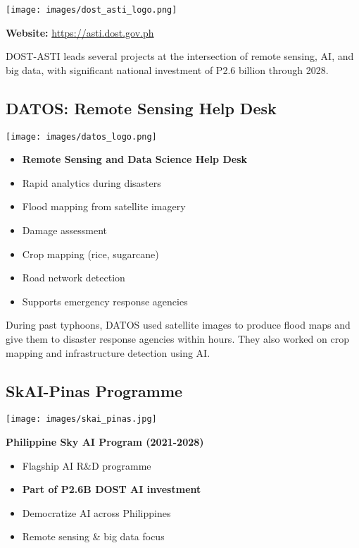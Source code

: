 \documentclass[
  letterpaper,
  DIV=11,
  numbers=noendperiod]{scrartcl}
\providecommand{\tightlist}{%
  \setlength{\itemsep}{0pt}\setlength{\parskip}{0pt}}
\begin{document}
\texttt{[image: images/dost\_asti\_logo.png]}

\textbf{Website:} \url{https://asti.dost.gov.ph}

DOST-ASTI leads several projects at the intersection of remote sensing,
AI, and big data, with significant national investment of P2.6 billion
through 2028.

\subsection{DATOS: Remote Sensing Help
Desk}\label{datos-remote-sensing-help-desk}

\begin{center}
\texttt{[image: images/datos\_logo.png]}
\end{center}

\begin{itemize}
\tightlist
\item
  \textbf{Remote Sensing and Data Science Help Desk}
\item
  Rapid analytics during disasters
\item
  Flood mapping from satellite imagery
\item
  Damage assessment
\item
  Crop mapping (rice, sugarcane)
\item
  Road network detection
\item
  Supports emergency response agencies
\end{itemize}

During past typhoons, DATOS used satellite images to produce flood maps
and give them to disaster response agencies within hours. They also
worked on crop mapping and infrastructure detection using AI.

\subsection{SkAI-Pinas Programme}\label{skai-pinas-programme}

\begin{center}
\texttt{[image: images/skai\_pinas.jpg]}
\end{center}

\textbf{Philippine Sky AI Program (2021-2028)}

\begin{itemize}
\tightlist
\item
  Flagship AI R\&D programme
\item
  \textbf{Part of P2.6B DOST AI investment}
\item
  Democratize AI across Philippines
\item
  Remote sensing \& big data focus
\end{itemize}
\end{document}

